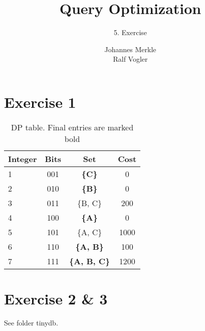 \documentclass[11pt,a4paper]{scrartcl}
\begin{document}
\author{Johannes Merkle\\Ralf Vogler}
\title{Query Optimization}
\subtitle{5. Exercise}

\maketitle

\section*{Exercise 1}


\begin{table}[H]
  \caption{DP table. Final entries are marked bold}
  \begin{center}
 \begin{tabular}{l|c|c|c}
Integer & Bits & Set & Cost\\
\hline
1 & 001 &  \textbf{\{C\}} 		& 0\\
2 & 010 &  \textbf{\{B\}} 		& 0\\
3 & 011 & \{B, C\} 				& 200\\
4 & 100 &  \textbf{\{A\}} 		& 0\\
5 & 101 & \{A, C\} 				& 1000\\
6 & 110 &  \textbf{\{A, B\}} 		& 100\\
7 & 111 &  \textbf{\{A, B, C\}} 	& 1200\\
 \end{tabular}  
  \end{center}
 \label{tab:gp1}
\end{table}

\section*{Exercise 2 \& 3}
See folder tinydb.
\end{document}
